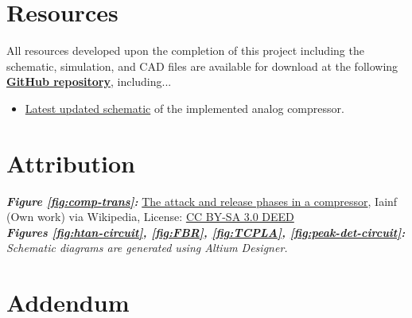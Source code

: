 \documentclass[10pt]{article}
\begin{document}
\begin{multicols*}{2}
        \section*{Resources}
            All resources developed upon the completion of this project including the schematic, simulation, and CAD files are available for download at the following \textbf{\textcolor{github-butterfly-bush}{\href{https://github.com/ShaunG-RU/DRC-Project}{GitHub repository}}}, including...
            
            \begin{itemize}
                \item \href{https://github.com/ShaunG-RU/DRC-Project/blob/main/Altium/DRC.pdf}{Latest updated schematic} of the implemented analog compressor.
            \end{itemize}

        \section*{Attribution}
            \footnotesize{
                \textit{\textbf{Figure \ref{fig:comp-trans}:}} \href{https://en.wikipedia.org/wiki/Dynamic_range_compression#/media/File:Audio_Compression_Attack_and_Release-2.svg}{The attack and release phases in a compressor}, Iainf (Own work) via Wikipedia, License: \href{https://creativecommons.org/licenses/by-sa/3.0/}{CC BY-SA 3.0 DEED}\\

                \noindent\textit{\textbf{Figures \ref{fig:htan-circuit}, \ref{fig:FBR}, \ref{fig:TCPLA}, \ref{fig:peak-det-circuit}:} Schematic diagrams are generated using Altium Designer.}\\
            }

        \printbibliography

    \end{multicols*}

    \newpage

    \section*{Addendum}
\end{document}
